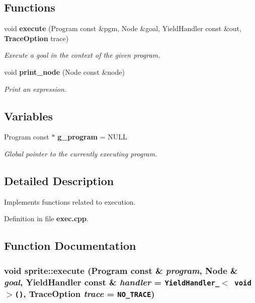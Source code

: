 \subsection*{Functions}
\begin{CompactItemize}
\item 
void {\bf execute} (Program const \&pgm, Node \&goal, Yield\-Handler const \&out, {\bf Trace\-Option} trace)
\begin{CompactList}\small\item\em Execute a goal in the context of the given program. \item\end{CompactList}\item 
void {\bf print\_\-node} (Node const \&node)
\begin{CompactList}\small\item\em Print an expression. \item\end{CompactList}\end{CompactItemize}
\subsection*{Variables}
\begin{CompactItemize}
\item 
Program const $\ast$ {\bf g\_\-program} = NULL\label{namespacesprite_a20}

\begin{CompactList}\small\item\em Global pointer to the currently executing program. \item\end{CompactList}\end{CompactItemize}


\subsection{Detailed Description}
Implements functions related to execution. 



Definition in file {\bf exec.cpp}.

\subsection{Function Documentation}
\subsubsection{\setlength{\rightskip}{0pt plus 5cm}void sprite::execute (Program const \& {\em program}, Node \& {\em goal}, Yield\-Handler const \& {\em handler} = {\tt YieldHandler\_\-$<$\ void\ $>$()}, {\bf Trace\-Option} {\em trace} = {\tt NO\_\-TRACE})}\label{namespacesprite_file_a49}



